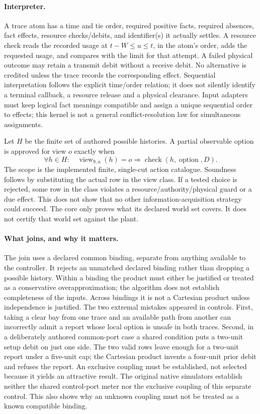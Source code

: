\documentclass[11pt]{article}
\begin{document}
\paragraph{Interpreter.}
A trace atom has a time and tie order, required positive facts, required
absences, fact effects, resource checks/debits, and identifier(s) it
actually settles. A resource check reads the recorded usage at
$t-W\leq u\leq t$, in the atom's order, adds the requested usage, and
compares with the limit for that attempt. A failed physical outcome may
retain a transmit debit without a receive debit. No alternative is
credited unless the trace records the corresponding effect. Sequential
interpretation follows the explicit time/order relation; it does not
silently identify a terminal callback, a resource release and a physical
clearance. Input adapters must keep logical fact meanings compatible
and assign a unique sequential order to effects; this kernel is not a
general conflict-resolution law for simultaneous assignments.

Let $H$ be the finite set of authored possible histories. A partial
observable option is approved for view $o$ exactly when
\[
  \forall h\in H:\quad \operatorname{view}_{9,a}(h)=o
    \Longrightarrow \operatorname{check}(h,\operatorname{option},D).
\]
The scope is the implemented finite, single-cut action catalogue.
Soundness follows by substituting the actual row in the view class.
If a tested choice is rejected, some row in the class violates a
resource/authority/physical guard or a due effect. This does not show
that no other information-acquisition strategy could succeed. The core
only proves what its declared world set covers. It does not certify
that world set against the plant.

\paragraph{What joins, and why it matters.}
The join uses a declared common binding, separate from anything
available to the controller. It rejects an unmatched declared binding
rather than dropping a possible history. Within a binding the product
must either be justified or treated as a conservative overapproximation;
the algorithm does not establish completeness of the inputs.
Across bindings it is not a Cartesian product unless
independence is justified. The two extremal mistakes appeared in
controls. First, taking a clear bay from one trace and an available
path from another can incorrectly admit a report whose local option is
unsafe in both traces. Second, in a deliberately authored common-port
case a shared condition puts a two-unit setup debit on just one side.
The two valid rows leave enough for a two-unit report under a
five-unit cap; the Cartesian product invents a four-unit prior debit
and refuses the report. An exclusive coupling must be established, not
selected because it yields an attractive result. The original native
simulators establish neither the shared control-port meter nor the
exclusive coupling of this separate control. This also shows why an
unknown coupling must not be treated as a known compatible binding.
\end{document}
